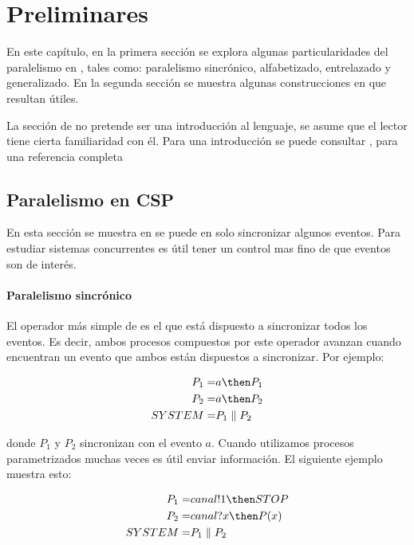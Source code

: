 \chapter{Preliminares}

En este capítulo, en la primera sección se explora algunas particularidades del paralelismo en \CSP, tales como: paralelismo sincrónico, alfabetizado, entrelazado y generalizado. En la segunda sección se muestra algunas construcciones en \CSPm que resultan útiles. 

La sección de \CSP no pretende ser una introducción al lenguaje, se asume que el lector tiene cierta familiaridad con él. Para una introducción se puede consultar \cite{Cristia:CSP}, para una referencia completa \cite{Roscoe:1997:TPC:550448}

\section{Paralelismo en CSP}

En esta sección se muestra en \CSP se puede en solo sincronizar algunos eventos. Para estudiar sistemas concurrentes es útil tener un control mas fino de que eventos son de interés. 

\subsubsection*{Paralelismo sincrónico}

El operador más simple de \CSP es el que está dispuesto a sincronizar todos los eventos. Es decir, ambos procesos compuestos por este operador avanzan cuando encuentran un evento que ambos están dispuestos a sincronizar. Por ejemplo:

\begin{align*}
P_1 =& a \then P_1\\
P_2 =& a \then P_2 \\
SYSTEM =& P_1 \parallel P_2
\end{align*}

donde $P_1$ y $P_2$ sincronizan con el evento $a$. Cuando utilizamos procesos parametrizados muchas veces es útil enviar información. El siguiente ejemplo muestra esto:

\begin{align*}
P_1 =& canal!1 \then STOP \\
P_2 =& canal?x \then P(x) \\
SYSTEM =& P_1 \parallel P_2 \\
\end{align*}

